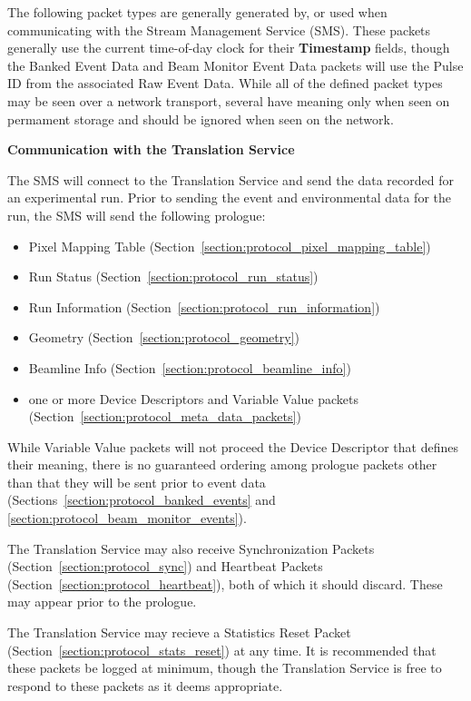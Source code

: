 The following packet types are generally generated by, or used when
communicating with the Stream Management Service (SMS). These packets generally
use the current time-of-day clock for their {\bf Timestamp} fields, though the
Banked Event Data and Beam Monitor Event Data packets will use the Pulse ID
from the associated Raw Event Data.  While all of the defined packet types may
be seen over a network transport, several have meaning only when seen on
permament storage and should be ignored when seen on the network.

{\large \bf Communication with the Translation Service}

The SMS will connect to the Translation Service and send the data recorded
for an experimental run. Prior to sending the event and environmental data
for the run, the SMS will send the following prologue:
\begin{itemize}
\item Pixel Mapping Table (Section~\ref{section:protocol_pixel_mapping_table})
\item Run Status (Section~\ref{section:protocol_run_status})
\item Run Information (Section~\ref{section:protocol_run_information})
\item Geometry (Section~\ref{section:protocol_geometry})
\item Beamline Info (Section~\ref{section:protocol_beamline_info})
\item one or more Device Descriptors and Variable Value packets
(Section~\ref{section:protocol_meta_data_packets})
\end{itemize}
While Variable Value packets will not proceed the Device Descriptor that
defines their meaning, there is no guaranteed ordering among prologue
packets other than that they will be sent prior to event data
(Sections~\ref{section:protocol_banked_events} and
\ref{section:protocol_beam_monitor_events}).

The Translation Service
may also receive Synchronization Packets (Section~\ref{section:protocol_sync})
and Heartbeat Packets (Section~\ref{section:protocol_heartbeat}), both of
which it should discard. These may appear prior to the prologue.

The Translation Service may recieve a Statistics Reset Packet
(Section~\ref{section:protocol_stats_reset}) at any time. It is recommended
that these packets be logged at minimum, though the Translation Service
is free to respond to these packets as it deems appropriate.

